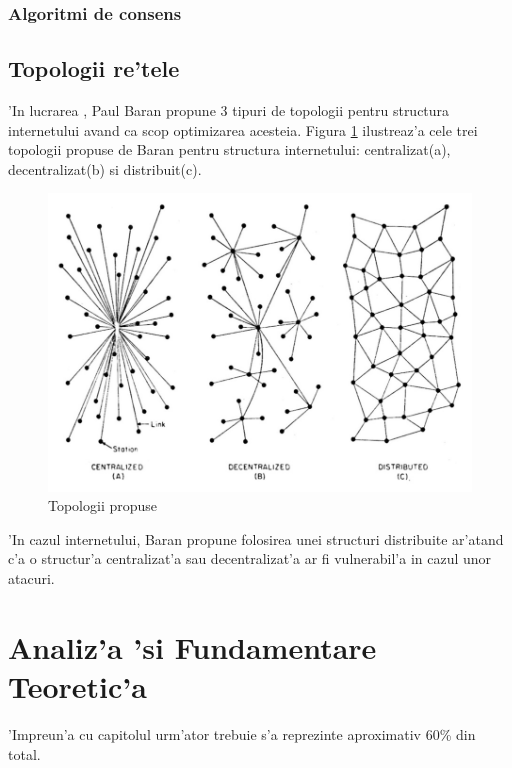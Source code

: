 \documentclass[12pt,a4paper,twoside]{report}
\begin{document}
\subsection{Algoritmi de consens}

\section{Topologii re'tele}
	'In lucrarea \cite{topologies}, Paul Baran propune 3 tipuri de topologii pentru structura internetului avand ca scop optimizarea acesteia. Figura \ref{fig:topologies} ilustreaz'a cele trei topologii propuse de Baran pentru structura internetului: centralizat(a), decentralizat(b) si distribuit(c).
	
		\begin{figure}[H]
		\begin{center}
			\includegraphics[scale=0.50]{img/topologies.jpg}
			\caption{Topologii propuse\cite{topologies}}
  			\label{fig:topologies}
  		\end{center}
  		\end{figure}
 	'In cazul internetului, Baran propune folosirea unei structuri distribuite ar'atand c'a o structur'a centralizat'a sau decentralizat'a ar fi vulnerabil'a in cazul unor atacuri.
	


\chapter{Analiz'a 'si Fundamentare Teoretic'a}
\label{ch:analysis}

'Impreun'a cu capitolul urm'ator trebuie s'a reprezinte aproximativ 60\% din total.
\end{document}
